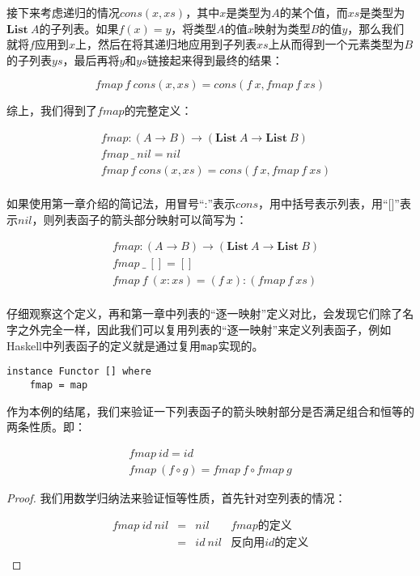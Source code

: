 \documentclass{article}
\begin{document}
\begin{example}
接下来考虑递归的情况$cons(x, xs)$，其中$x$是类型为$A$的某个值，而$xs$是类型为$\mathbf{List}\ A$的子列表。如果$f(x) = y$，将类型$A$的值$x$映射为类型$B$的值$y$，那么我们就将$f$应用到$x$上，然后在将其递归地应用到子列表$xs$上从而得到一个元素类型为$B$的子列表$ys$，最后再将$y$和$ys$链接起来得到最终的结果：

\[
fmap\ f\ cons(x, xs) = cons(f\ x, fmap\ f\ xs)
\]

综上，我们得到了$fmap$的完整定义：

\[
\begin{array}{l}
\quad    fmap : (A \to B) \to (\mathbf{List}\ A \to \mathbf{List}\ B) \\
\quad    fmap\ \_\ nil = nil \\
\quad    fmap\ f\ cons(x, xs) = cons(f\ x, fmap\ f\ xs) \\
\end{array}
\]

如果使用第一章介绍的简记法，用冒号“:”表示$cons$，用中括号表示列表，用“[]”表示$nil$，则列表函子的箭头部分映射可以简写为：

\[
\begin{array}{l}
\quad    fmap : (A \to B) \to (\mathbf{List}\ A \to \mathbf{List}\ B) \\
\quad    fmap\ \_\ [] = [] \\
\quad    fmap\ f\ (x:xs) = (f\ x):(fmap\ f\ xs) \\
\end{array}
\]

仔细观察这个定义，再和第一章中列表的“逐一映射”定义对比，会发现它们除了名字之外完全一样，因此我们可以复用列表的“逐一映射”来定义列表函子，例如Haskell中列表函子的定义就是通过复用\texttt{map}实现的。

\lstset{frame=single}
\begin{lstlisting}
instance Functor [] where
    fmap = map
\end{lstlisting}

作为本例的结尾，我们来验证一下列表函子的箭头映射部分是否满足组合和恒等的两条性质。即：

\[
\begin{array}{l}
fmap\ id = id \\
fmap\ (f \circ g) = fmap\ f \circ fmap\ g
\end{array}
\]

\begin{proof}
我们用数学归纳法来验证恒等性质，首先针对空列表的情况：

\[
\begin{array}{rcll}
fmap\ id\ nil & = & nil & \text{$fmap$的定义} \\
              & = & id\ nil & \text{反向用$id$的定义} \\
\end{array}
\]


\end{proof}
\end{example}
\end{document}
